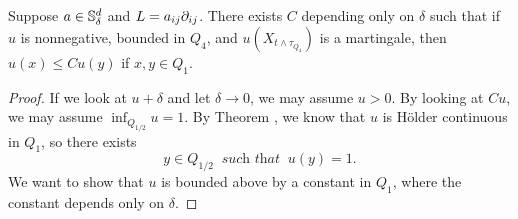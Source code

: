 	\begin{theorem}\label{thm:harnack}
 Suppose $a\in {\mathbb S}^d_\delta$ and $L=a_{ij}\partial_{ij}$. There exists $C$ depending only on $\delta$ such that if $u$ is nonnegative, bounded in $Q_4$, and $u(X_{t \wedge \tau_{Q_4}})$ is a martingale, then $u(x) \leq C u(y)$ if $x, y \in Q_1$.
    \end{theorem}
    \begin{proof}
        If we look at $u+\delta$ and let $\delta \rightarrow 0$, we may assume $u>0$. By looking at $C u$, we may assume $\inf _{Q_{1/2}} u=1$. By Theorem , we know that $u$ is Hölder continuous in $Q_1$, so there exists
        \[
            y \in Q_{1 / 2} ~\textit{ such that }~ u(y)=1. 
        \]
        We want to show that $u$ is bounded above by a constant in $Q_1$, where the constant depends only on $\delta$.
        

\end{proof}
